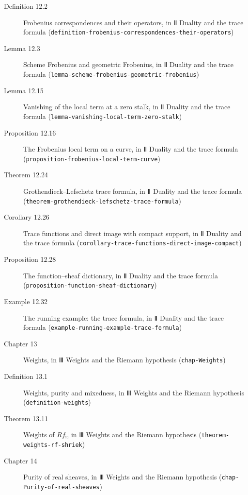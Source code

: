 \documentclass[11pt]{article}
\newcommand{\bpslug}[1]{\texttt{#1}}
\begin{document}
\begin{description}
\item[Definition 12.2] Frobenius correspondences and their operators, in Ⅱ Duality and the trace formula (\bpslug{definition-{}\allowbreak{}frobenius-{}\allowbreak{}correspondences-{}\allowbreak{}their-{}\allowbreak{}operators})
\item[Lemma 12.3] Scheme Frobenius and geometric Frobenius, in Ⅱ Duality and the trace formula (\bpslug{lemma-{}\allowbreak{}scheme-{}\allowbreak{}frobenius-{}\allowbreak{}geometric-{}\allowbreak{}frobenius})
\item[Lemma 12.15] Vanishing of the local term at a zero stalk, in Ⅱ Duality and the trace formula (\bpslug{lemma-{}\allowbreak{}vanishing-{}\allowbreak{}local-{}\allowbreak{}term-{}\allowbreak{}zero-{}\allowbreak{}stalk})
\item[Proposition 12.16] The Frobenius local term on a curve, in Ⅱ Duality and the trace formula (\bpslug{proposition-{}\allowbreak{}frobenius-{}\allowbreak{}local-{}\allowbreak{}term-{}\allowbreak{}curve})
\item[Theorem 12.24] Grothendieck–Lefschetz trace formula, in Ⅱ Duality and the trace formula (\bpslug{theorem-{}\allowbreak{}grothendieck-{}\allowbreak{}lefschetz-{}\allowbreak{}trace-{}\allowbreak{}formula})
\item[Corollary 12.26] Trace functions and direct image with compact support, in Ⅱ Duality and the trace formula (\bpslug{corollary-{}\allowbreak{}trace-{}\allowbreak{}functions-{}\allowbreak{}direct-{}\allowbreak{}image-{}\allowbreak{}compact})
\item[Proposition 12.28] The function–sheaf dictionary, in Ⅱ Duality and the trace formula (\bpslug{proposition-{}\allowbreak{}function-{}\allowbreak{}sheaf-{}\allowbreak{}dictionary})
\item[Example 12.32] The running example: the trace formula, in Ⅱ Duality and the trace formula (\bpslug{example-{}\allowbreak{}running-{}\allowbreak{}example-{}\allowbreak{}trace-{}\allowbreak{}formula})
\item[Chapter 13] Weights, in Ⅲ Weights and the Riemann hypothesis (\bpslug{chap-{}\allowbreak{}Weights})
\item[Definition 13.1] Weights, purity and mixedness, in Ⅲ Weights and the Riemann hypothesis (\bpslug{definition-{}\allowbreak{}weights})
\item[Theorem 13.11] Weights of $Rf_!$, in Ⅲ Weights and the Riemann hypothesis (\bpslug{theorem-{}\allowbreak{}weights-{}\allowbreak{}rf-{}\allowbreak{}shriek})
\item[Chapter 14] Purity of real sheaves, in Ⅲ Weights and the Riemann hypothesis (\bpslug{chap-{}\allowbreak{}Purity-{}\allowbreak{}of-{}\allowbreak{}real-{}\allowbreak{}sheaves})

\end{description}
\end{document}
